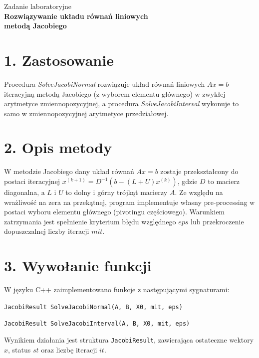 \documentclass[11pt,a4paper]{article}
\begin{document}
\begin{center}
    Zadanie laboratoryjne \\[1em]
    \Large\textbf{Rozwiązywanie układu równań liniowych \\ metodą Jacobiego}
\end{center}

\vspace{1em}

\section*{1. Zastosowanie}
Procedura \textit{SolveJacobiNormal} rozwiązuje układ równań liniowych $Ax=b$ iteracyjną metodą Jacobiego (z wyborem elementu głównego) w zwykłej arytmetyce zmiennopozycyjnej, a procedura \textit{SolveJacobiInterval} wykonuje to samo w zmiennopozycyjnej arytmetyce przedziałowej.

\section*{2. Opis metody}
W metodzie Jacobiego dany układ równań $Ax=b$ zostaje przekształcony do postaci iteracyjnej $x^{(k+1)} = D^{-1}(b - (L+U)x^{(k)})$, gdzie $D$ to macierz diagonalna, a $L$ i $U$ to dolny i górny trójkąt macierzy $A$. Ze względu na wrażliwość na zera na przekątnej, program implementuje własny pre-processing w postaci wyboru elementu głównego (pivotingu częściowego). Warunkiem zatrzymania jest spełnienie kryterium błędu względnego $eps$ lub przekroczenie dopuszczalnej liczby iteracji $mit$.

\section*{3. Wywołanie funkcji}
W języku C++ zaimplementowano funkcje z następującymi sygnaturami:

\vspace{0.5em}
\noindent \texttt{JacobiResult SolveJacobiNormal(A, B, X0, mit, eps)}

\noindent \texttt{JacobiResult SolveJacobiInterval(A, B, X0, mit, eps)}

Wynikiem działania jest struktura \texttt{JacobiResult}, zawierająca ostateczne wektory $x$, status $st$ oraz liczbę iteracji $it$.
\end{document}
